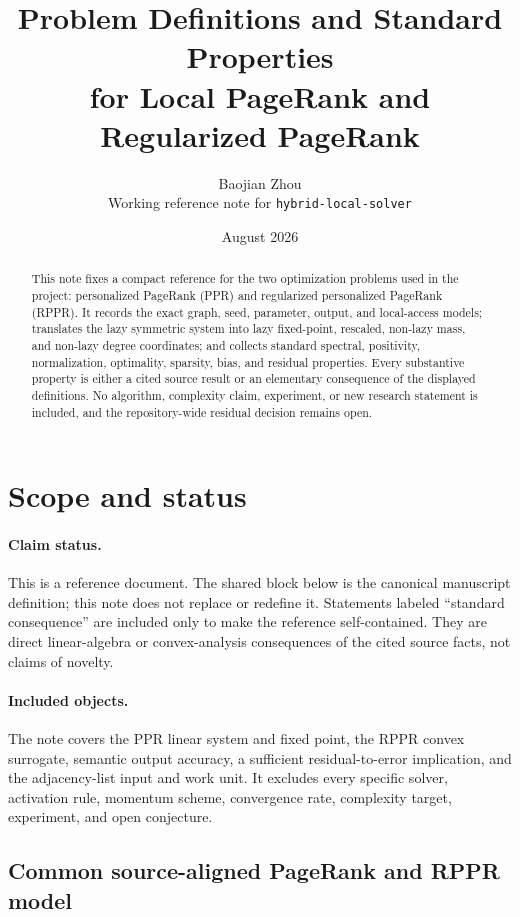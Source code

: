 \documentclass[11pt]{article}
\title{Problem Definitions and Standard Properties\\
for Local PageRank and Regularized PageRank}
\author{Baojian Zhou\\
\small Working reference note for \texttt{hybrid-local-solver}}
\date{August 2026}
\theoremstyle{definition}
\theoremstyle{remark}
\theoremstyle{plain}
\begin{document}
\maketitle

\begin{abstract}
This note fixes a compact reference for the two optimization problems used in
the project: personalized PageRank (PPR) and regularized personalized PageRank
(RPPR).  It records the exact graph, seed, parameter, output, and local-access
models; translates the lazy symmetric system into lazy fixed-point, rescaled,
non-lazy mass, and non-lazy degree coordinates; and collects standard
spectral, positivity, normalization, optimality, sparsity, bias, and residual
properties.  Every substantive property is either a cited source result or an
elementary consequence of the displayed definitions.  No algorithm,
complexity claim, experiment, or new research statement is included, and the
repository-wide residual decision remains open.
\end{abstract}

\section{Scope and status}
\label{sec:problem-definitions-scope}

\paragraph{Claim status.}
This is a \statussource{} reference document.  The shared block below is the
canonical manuscript definition; this note does not replace or redefine it.
Statements labeled ``standard consequence'' are included only to make the
reference self-contained.  They are direct linear-algebra or convex-analysis
consequences of the cited source facts, not claims of novelty.

\paragraph{Included objects.}
The note covers the PPR linear system and fixed point, the RPPR convex
surrogate, semantic output accuracy, a sufficient residual-to-error
implication, and the adjacency-list input and work unit.  It excludes every
specific solver, activation rule, momentum scheme, convergence rate,
complexity target, experiment, and open conjecture.

\subsection{Common source-aligned PageRank and RPPR model}
\label{subsec:shared-source-aligned-problem}
\end{document}

